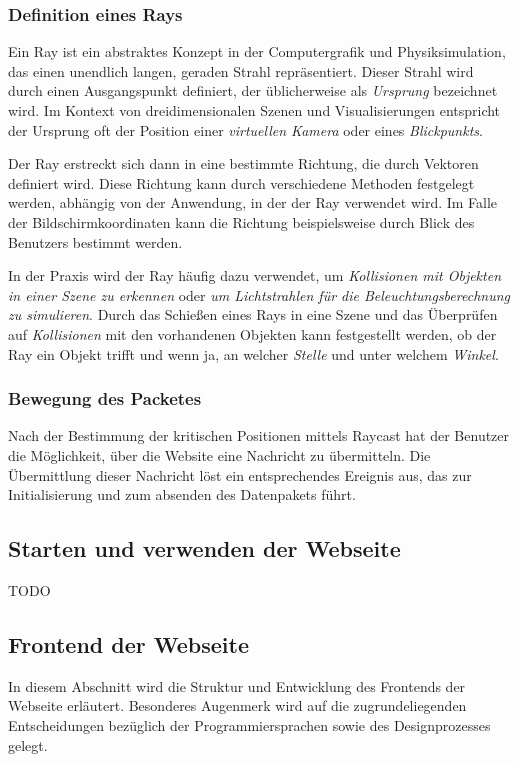 \subsubsection*{Definition eines Rays} %
Ein Ray ist ein abstraktes Konzept in der Computergrafik und Physiksimulation, das einen unendlich langen, geraden
Strahl repräsentiert. Dieser Strahl wird durch einen Ausgangspunkt definiert, der üblicherweise als \textit{Ursprung}
bezeichnet wird. Im Kontext von dreidimensionalen Szenen und Visualisierungen entspricht der Ursprung oft der Position
einer \textit{virtuellen Kamera} oder eines \textit{Blickpunkts}.

Der Ray erstreckt sich dann in eine bestimmte Richtung, die durch Vektoren definiert wird. Diese Richtung kann durch
verschiedene Methoden festgelegt werden, abhängig von der Anwendung, in der der Ray verwendet wird. Im Falle der
Bildschirmkoordinaten kann die Richtung beispielsweise durch  Blick des Benutzers bestimmt werden.

In der Praxis wird der Ray häufig dazu verwendet, um \textit{Kollisionen mit Objekten in einer Szene zu erkennen} oder
\textit{um Lichtstrahlen für die Beleuchtungsberechnung zu simulieren}. Durch das Schießen eines Rays in eine Szene und
das Überprüfen auf \textit{Kollisionen} mit den vorhandenen Objekten kann festgestellt werden, ob der Ray ein Objekt
trifft und wenn ja, an welcher \textit{Stelle} und unter welchem \textit{Winkel}.\\

\subsubsection{Bewegung des Packetes}
Nach der Bestimmung der kritischen Positionen mittels Raycast hat der Benutzer die Möglichkeit, über die Website eine
Nachricht zu übermitteln. Die Übermittlung dieser Nachricht löst ein entsprechendes Ereignis aus, das zur
Initialisierung und zum absenden des Datenpakets führt.

\subsection{Starten und verwenden der Webseite} 
TODO

\subsection{Frontend der Webseite} 
In diesem Abschnitt wird die Struktur und Entwicklung des Frontends der Webseite erläutert. Besonderes Augenmerk wird
auf die zugrundeliegenden Entscheidungen bezüglich der Programmiersprachen sowie des Designprozesses gelegt.

